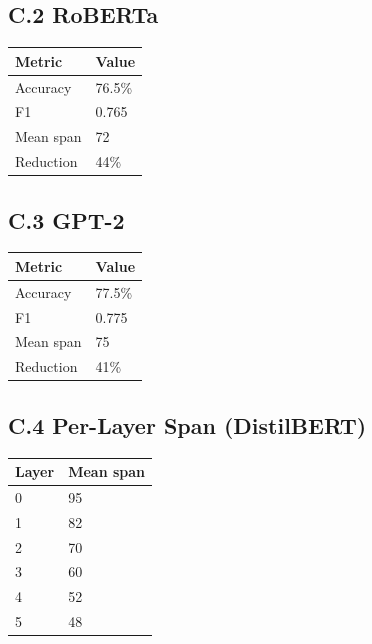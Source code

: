 \subsection{C.2 RoBERTa}

\begin{table}[H]
\centering
\small
\begin{tabular}{ll}
\toprule
\textbf{Metric} & \textbf{Value} \\
\midrule
Accuracy & 76.5\% \\
F1 & 0.765 \\
Mean span & 72 \\
Reduction & 44\% \\
\bottomrule
\end{tabular}
\end{table}

\subsection{C.3 GPT-2}

\begin{table}[H]
\centering
\small
\begin{tabular}{ll}
\toprule
\textbf{Metric} & \textbf{Value} \\
\midrule
Accuracy & 77.5\% \\
F1 & 0.775 \\
Mean span & 75 \\
Reduction & 41\% \\
\bottomrule
\end{tabular}
\end{table}

\subsection{C.4 Per-Layer Span (DistilBERT)}

\begin{table}[H]
\centering
\small
\begin{tabular}{ll}
\toprule
\textbf{Layer} & \textbf{Mean span} \\
\midrule
0 & 95 \\
1 & 82 \\
2 & 70 \\
3 & 60 \\
4 & 52 \\
5 & 48 \\
\bottomrule
\end{tabular}
\end{table}

